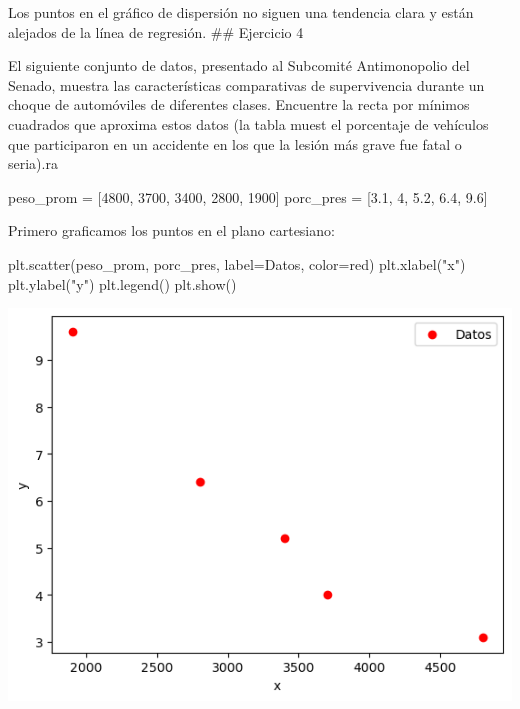 \documentclass[
  letterpaper,
  DIV=11,
  numbers=noendperiod]{scrartcl}
\newenvironment{Shaded}{\begin{snugshade}}{\end{snugshade}}
\newcommand{\DecValTok}[1]{\textcolor[rgb]{0.68,0.00,0.00}{#1}}
\newcommand{\FloatTok}[1]{\textcolor[rgb]{0.68,0.00,0.00}{#1}}
\newcommand{\NormalTok}[1]{\textcolor[rgb]{0.00,0.23,0.31}{#1}}
\newcommand{\OperatorTok}[1]{\textcolor[rgb]{0.37,0.37,0.37}{#1}}
\newcommand{\StringTok}[1]{\textcolor[rgb]{0.13,0.47,0.30}{#1}}
\begin{document}
Los puntos en el gráfico de dispersión no siguen una tendencia clara y
están alejados de la línea de regresión. \#\# Ejercicio 4

El siguiente conjunto de datos, presentado al Subcomité Antimonopolio
del Senado, muestra las características comparativas de supervivencia
durante un choque de automóviles de diferentes clases. Encuentre la
recta por mínimos cuadrados que aproxima estos datos (la tabla muest el
porcentaje de vehículos que participaron en un accidente en los que la
lesión más grave fue fatal o seria).ra

\begin{Shaded}
\begin{Highlighting}[]
\NormalTok{peso\_prom }\OperatorTok{=}\NormalTok{ [}\DecValTok{4800}\NormalTok{, }\DecValTok{3700}\NormalTok{, }\DecValTok{3400}\NormalTok{, }\DecValTok{2800}\NormalTok{, }\DecValTok{1900}\NormalTok{]}
\NormalTok{porc\_pres }\OperatorTok{=}\NormalTok{ [}\FloatTok{3.1}\NormalTok{, }\DecValTok{4}\NormalTok{, }\FloatTok{5.2}\NormalTok{, }\FloatTok{6.4}\NormalTok{, }\FloatTok{9.6}\NormalTok{]}
\end{Highlighting}
\end{Shaded}

Primero graficamos los puntos en el plano cartesiano:

\begin{Shaded}
\begin{Highlighting}[]

\NormalTok{plt.scatter(peso\_prom, porc\_pres, label}\OperatorTok{=}\StringTok{\textquotesingle{}Datos\textquotesingle{}}\NormalTok{, color}\OperatorTok{=}\StringTok{\textquotesingle{}red\textquotesingle{}}\NormalTok{)}
\NormalTok{plt.xlabel(}\StringTok{"x"}\NormalTok{)}
\NormalTok{plt.ylabel(}\StringTok{"y"}\NormalTok{)}
\NormalTok{plt.legend()}
\NormalTok{plt.show()}
\end{Highlighting}
\end{Shaded}

\includegraphics{Tarea8_MN_files/figure-pdf/cell-19-output-1.png}
\end{document}
